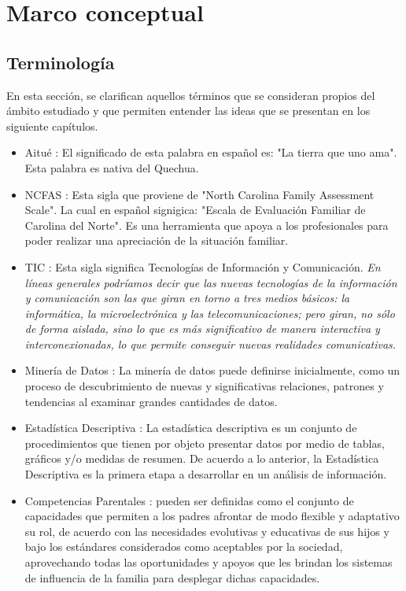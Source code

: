 
\chapter{Marco conceptual}
\label{mconceptual}

\section{Terminología}
En esta sección, se clarifican aquellos términos que se consideran propios del ámbito estudiado y que permiten entender las ideas que se presentan en los siguiente capítulos.

\begin{itemize}
	
	\item Aitué \cite{ref5}: El significado de esta palabra en español es: "La tierra que uno ama". Esta palabra es nativa del Quechua. 
	\item NCFAS \cite{VALENCIA2010}: Esta sigla que proviene de "North Carolina Family Assessment Scale". La cual en español signigica: "Escala de Evaluación Familiar de Carolina del Norte". Es una herramienta que apoya a los profesionales para poder realizar una apreciación de la situación familiar. 
	\item TIC \cite{almenara2007impacto}: Esta sigla significa Tecnologías de Información y Comunicación. \textit{En líneas generales podríamos decir que las nuevas tecnologías de la información y comunicación son las que giran en torno a tres medios básicos: la informática, la microelectrónica y las telecomunicaciones; pero giran, no sólo de forma aislada, sino lo que es más significativo de manera interactiva y interconexionadas, lo que permite conseguir nuevas realidades comunicativas.}
	\item Minería de Datos \cite{lopez2007mineria}: La minería de datos puede definirse inicialmente, como un proceso de descubrimiento de nuevas y significativas relaciones, patrones y tendencias al examinar grandes cantidades de datos. 
	\item Estadística Descriptiva \cite{alicia2010correlacion}: La estadística descriptiva es un conjunto de procedimientos que tienen por objeto presentar datos por medio de tablas, gráficos y/o medidas de resumen. De acuerdo a lo anterior, la Estadística Descriptiva es la primera etapa a desarrollar en un análisis de información.
	
	\item Competencias Parentales \cite{rodrigo2008preservacion}: pueden ser definidas como el conjunto de capacidades que permiten a los padres afrontar de modo flexible y adaptativo su rol, de acuerdo con las necesidades evolutivas y educativas de sus hijos y bajo los estándares considerados como aceptables por la sociedad, aprovechando todas las oportunidades y apoyos que les brindan los sistemas de influencia de la familia para desplegar dichas capacidades.
	
\end{itemize}

